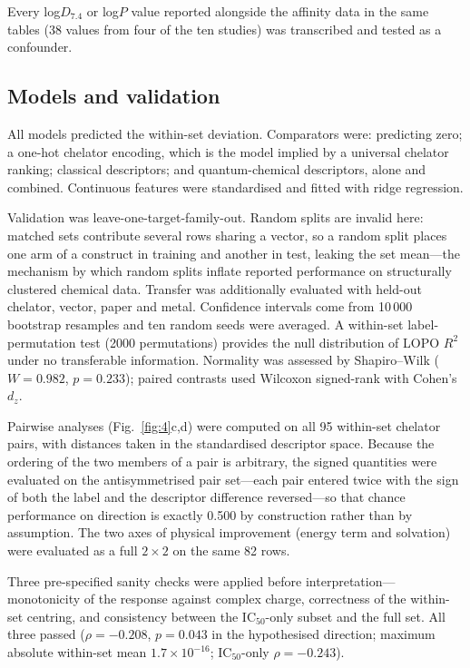 Every log$D_{7.4}$ or log$P$ value reported alongside the affinity data in the same tables (38 values from four of the ten studies) was transcribed and tested as a confounder.

\subsection{Models and validation}

All models predicted the within-set deviation. Comparators were: predicting zero; a one-hot chelator encoding, which is the model implied by a universal chelator ranking; classical descriptors; and quantum-chemical descriptors, alone and combined. Continuous features were standardised and fitted with ridge regression.

Validation was leave-one-target-family-out. Random splits are invalid here: matched sets contribute several rows sharing a vector, so a random split places one arm of a construct in training and another in test, leaking the set mean---the mechanism by which random splits inflate reported performance on structurally clustered chemical data.\cite{Kim2026TAS2R,Boldini2025UMAP,Tropsha2025Eval} Transfer was additionally evaluated with held-out chelator, vector, paper and metal. Confidence intervals come from 10\,000 bootstrap resamples and ten random seeds were averaged. A within-set label-permutation test (2000 permutations) provides the null distribution of LOPO $R^2$ under no transferable information. Normality was assessed by Shapiro--Wilk ($W = 0.982$, $p = 0.233$); paired contrasts used Wilcoxon signed-rank with Cohen's $d_z$.

Pairwise analyses (Fig.~\ref{fig:4}c,d) were computed on all 95 within-set chelator pairs, with distances taken in the standardised descriptor space. Because the ordering of the two members of a pair is arbitrary, the signed quantities were evaluated on the antisymmetrised pair set---each pair entered twice with the sign of both the label and the descriptor difference reversed---so that chance performance on direction is exactly 0.500 by construction rather than by assumption. The two axes of physical improvement (energy term and solvation) were evaluated as a full $2 \times 2$ on the same 82 rows.

Three pre-specified sanity checks were applied before interpretation---monotonicity of the response against complex charge, correctness of the within-set centring, and consistency between the IC$_{50}$-only subset and the full set. All three passed ($\rho = -0.208$, $p = 0.043$ in the hypothesised direction; maximum absolute within-set mean $1.7\times10^{-16}$; IC$_{50}$-only $\rho = -0.243$).

